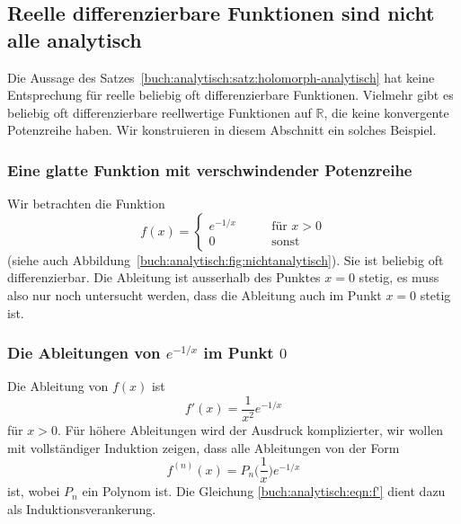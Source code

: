 %
%
%
\subsection{Reelle differenzierbare Funktionen sind nicht alle analytisch
\label{buch:analytisch:potenzreihen:nichtanalytisch}}
Die Aussage des Satzes~\ref{buch:analytisch:satz:holomorph-analytisch}
hat keine Entsprechung für reelle beliebig oft differenzierbare
Funktionen.
Vielmehr gibt es beliebig oft differenzierbare reellwertige
Funktionen auf $\mathbb{R}$, die keine konvergente Potenzreihe haben.
Wir konstruieren in diesem Abschnitt ein solches Beispiel.

%
%
\subsubsection{Eine glatte Funktion mit verschwindender Potenzreihe}
%
Wir betrachten die Funktion
\begin{equation}
f(x)
=
\begin{cases}
e^{-1/x}&\qquad \text{für $x>0$}\\
0&\qquad\text{sonst}
\end{cases}
\label{buch:analytisch:fig:nichtanalytisch}
\end{equation}
(siehe auch Abbildung~\ref{buch:analytisch:fig:nichtanalytisch}).
Sie ist beliebig oft differenzierbar.
Die Ableitung ist ausserhalb des Punktes $x=0$ stetig, es muss also
nur noch untersucht werden, dass die Ableitung auch im Punkt $x=0$
stetig ist.

%
%
\subsubsection{Die Ableitungen von $e^{-1/x}$ im Punkt $0$}
Die Ableitung von $f(x)$ ist
\begin{equation}
f'(x)
=
\frac{1}{x^2}
e^{-1/x}
\label{buch:analytisch:eqn:f'}
\end{equation}
für $x>0$.
Für höhere Ableitungen wird der Ausdruck komplizierter, wir wollen
mit vollständiger Induktion zeigen, dass alle Ableitungen von der Form
\begin{equation}
f^{(n)}(x)
=
P_n\biggl(\frac1x\biggr) e^{-1/x}
\label{buch:analytisch:eqn:fn=Pne}
\end{equation}
ist, wobei $P_n$ ein Polynom ist.
Die Gleichung \eqref{buch:analytisch:eqn:f'} dient dazu als
Induktionsverankerung.

